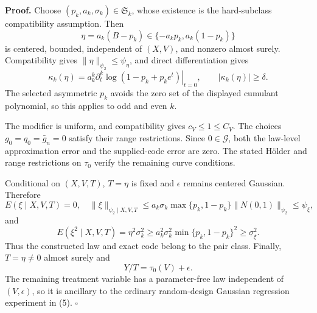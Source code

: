\textbf{Proof.}
Choose \((p_k,a_k,\sigma_k)\in\mathfrak S_k\), whose existence is the hard-subclass compatibility assumption. Then
\[
 \eta=a_k(B-p_k)\in\{-a_kp_k,a_k(1-p_k)\} \tag{1}
\]
is centered, bounded, independent of \((X,V)\), and nonzero almost surely. Compatibility gives \(\|\eta\|_{\psi_2}\le\psi_\eta\), and direct differentiation gives
\[
 \kappa_k(\eta)=a_k^k
 \left.\partial_t^k\log(1-p_k+p_ke^t)\right|_{t=0},
 \qquad |\kappa_k(\eta)|\ge\delta. \tag{2}
\]
The selected asymmetric \(p_k\) avoids the zero set of the displayed cumulant polynomial, so this applies to odd and even \(k\).

The modifier is uniform, and compatibility gives \(c_V\le1\le C_V\). The choices \(g_0=q_0=\bar g_n=0\) satisfy their range restrictions. Since \(0\in\mathcal G\), both the law-level approximation error and the supplied-code error are zero. The stated H\"older and range restrictions on \(\tau_0\) verify the remaining curve conditions.

Conditional on \((X,V,T)\), \(T=\eta\) is fixed and \(\epsilon\) remains centered Gaussian. Therefore
\[
 E(\xi\mid X,V,T)=0,\quad
 \|\xi\|_{\psi_2\mid X,V,T}
 \le a_k\sigma_k\max\{p_k,1-p_k\}\|N(0,1)\|_{\psi_2}
 \le\psi_\xi, \tag{3}
\]
and
\[
 E(\xi^2\mid X,V,T)=\eta^2\sigma_k^2
 \ge a_k^2\sigma_k^2\min\{p_k,1-p_k\}^2
 \ge\underline\sigma_\xi^2. \tag{4}
\]
Thus the constructed law and exact code belong to the pair class. Finally, \(T=\eta\ne0\) almost surely and
\[
 Y/T=\tau_0(V)+\epsilon. \tag{5}
\]
The remaining treatment variable has a parameter-free law independent of \((V,\epsilon)\), so it is ancillary to the ordinary random-design Gaussian regression experiment in (5). \(\square\)